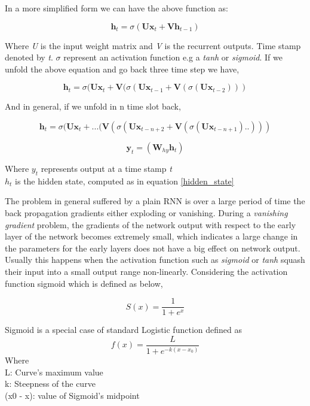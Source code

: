 In a more simplified form we can have the above function as:

\begin{equation}\label{hidden_state}
	\textbf{h}_t = \sigma (\textbf{Ux}_t + \textbf{Vh}_{t-1}) 
\end{equation}

Where \textit{U} is the input weight matrix and \textit{V} is the recurrent outputs. Time stamp denoted by \textit{t}. $\sigma$ represent an activation function e.g a \textit{tanh} or \textit{sigmoid}. If we unfold the above equation and go back three time step we have,

\begin{equation}
	\textbf{h}_t = \sigma (\textbf{Ux}_t + \textbf{V}(\sigma(\textbf{Ux}_{t-1} + \textbf{V}(\sigma(\textbf{Ux}_{t-2})))
\end{equation}

And in general, if we unfold in n time slot back,

\begin{equation}
\textbf{h}_t = \sigma (\textbf{Ux}_t + ...( \textbf{V}(\sigma(\textbf{Ux}_{t-n+2} + \textbf{V}(\sigma(\textbf{Ux}_{t-n+1})..)))
\end{equation}

\begin{equation}
	\textbf{y}_t = (\textbf{W}_{hy}  \textbf{h}_{t}) 
\end{equation}

Where \textbf{$y_t$}  represents output at a time stamp \textit{t} \\
\textbf{$h_t$} is the hidden state, computed as in equation \ref{hidden_state}

The problem in general suffered by a plain RNN is over a large period of time the back propagation gradients either exploding or vanishing. During a \textit{vanishing gradient } problem, the gradients of the network output with respect to the early layer of the network becomes extremely small, which indicates a large change in the parameters for the early layers does not have a big effect on network output. Usually this happens when the activation function such as \textit{sigmoid} or \textit{tanh} squash their input into a small output range non-linearly. Considering the activation function sigmoid which is defined as below,

\begin{equation}
	S(x) = \frac{1}{ 1+ e^x}
\end{equation}

Sigmoid is a special case of standard Logistic function defined as 
\begin{equation}
f(x) = \frac{L}{ 1+ e^{-k(x-x_0)}}
\end{equation}
Where \\
L: Curve's maximum value \\
k: Steepness of the curve \\
(x0 - x): value of Sigmoid's midpoint \\

